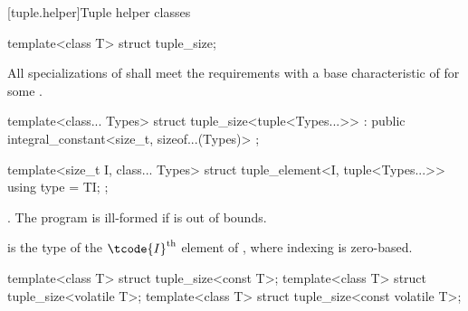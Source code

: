 [tuple.helper]{Tuple helper classes}

%
\begin{itemdecl}
template<class T> struct tuple_size;
\end{itemdecl}

\begin{itemdescr}
\pnum
\remarks
All specializations of  shall meet the
 requirements with a
base characteristic of 
for some .
\end{itemdescr}

%
\begin{itemdecl}
template<class... Types>
  struct tuple_size<tuple<Types...>> : public integral_constant<size_t, sizeof...(Types)> { };
\end{itemdecl}

%
\begin{itemdecl}
template<size_t I, class... Types>
  struct tuple_element<I, tuple<Types...>> {
    using type = TI;
  };
\end{itemdecl}

\begin{itemdescr}
\pnum
\requires {}.
The program is ill-formed if  is out of bounds.

\pnum
\ctype {} is the
type of the $\tcode{I}^\text{th}$ element of ,
where indexing is zero-based.
\end{itemdescr}

%
\begin{itemdecl}
template<class T> struct tuple_size<const T>;
template<class T> struct tuple_size<volatile T>;
template<class T> struct tuple_size<const volatile T>;
\end{itemdecl}

